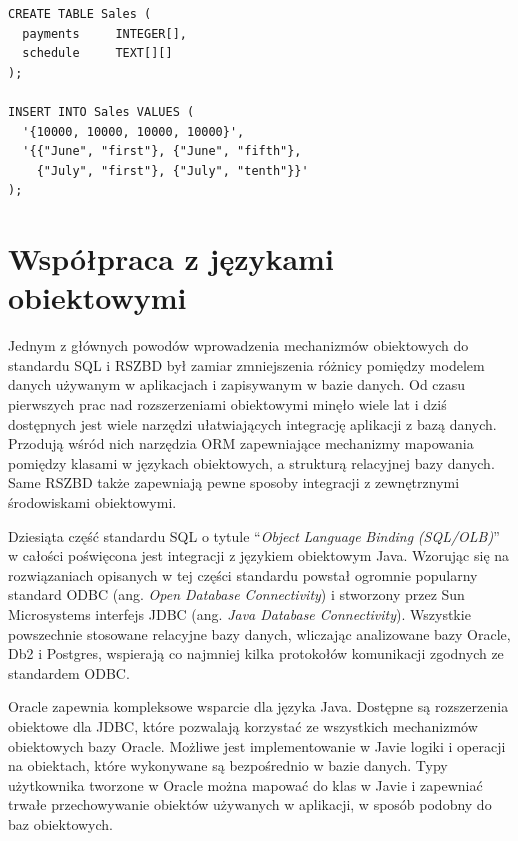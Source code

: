 \documentclass[a4paper,twoside,12pt]{book}
\begin{document}
\begin{lstlisting}[style=SQL, caption={Typy kolekcji w PostgreSQL.}, label={listing:postgres-collection-types}, captionpos=b]
CREATE TABLE Sales (
  payments     INTEGER[],
  schedule     TEXT[][]
);

INSERT INTO Sales VALUES (
  '{10000, 10000, 10000, 10000}',
  '{{"June", "first"}, {"June", "fifth"},
    {"July", "first"}, {"July", "tenth"}}'
);
\end{lstlisting}
 
\section{Współpraca z językami obiektowymi}

Jednym z głównych powodów wprowadzenia mechanizmów obiektowych do standardu SQL i RSZBD był zamiar zmniejszenia różnicy pomiędzy modelem danych używanym w aplikacjach i zapisywanym w bazie danych. Od czasu pierwszych prac nad rozszerzeniami obiektowymi minęło wiele lat i dziś dostępnych jest wiele narzędzi ułatwiających integrację aplikacji z bazą danych. Przodują wśród nich narzędzia ORM zapewniające mechanizmy mapowania pomiędzy klasami w językach obiektowych, a strukturą relacyjnej bazy danych. Same RSZBD także zapewniają pewne sposoby integracji z zewnętrznymi środowiskami obiektowymi.

Dziesiąta część standardu SQL o tytule ``\textit{Object} \textit{Language} \textit{Binding} \textit{(SQL/OLB)}'' w całości poświęcona jest integracji z językiem obiektowym Java. Wzorując się na rozwiązaniach opisanych w tej części standardu powstał ogromnie popularny standard ODBC (ang. \textit{Open Database Connectivity}) i stworzony przez Sun Microsystems interfejs JDBC (ang. \textit{Java Database Connectivity}). Wszystkie powszechnie stosowane relacyjne bazy danych, wliczając analizowane bazy Oracle, Db2 i Postgres, wspierają co najmniej kilka protokołów komunikacji zgodnych ze standardem ODBC.

Oracle zapewnia kompleksowe wsparcie dla języka Java. Dostępne są rozszerzenia obiektowe dla JDBC, które pozwalają korzystać ze wszystkich mechanizmów obiektowych bazy Oracle. Możliwe jest implementowanie w Javie logiki i operacji na obiektach, które wykonywane są bezpośrednio w bazie danych. Typy użytkownika tworzone w Oracle można mapować do klas w Javie i zapewniać trwałe przechowywanie obiektów używanych w aplikacji, w sposób podobny do baz obiektowych.
\end{document}
